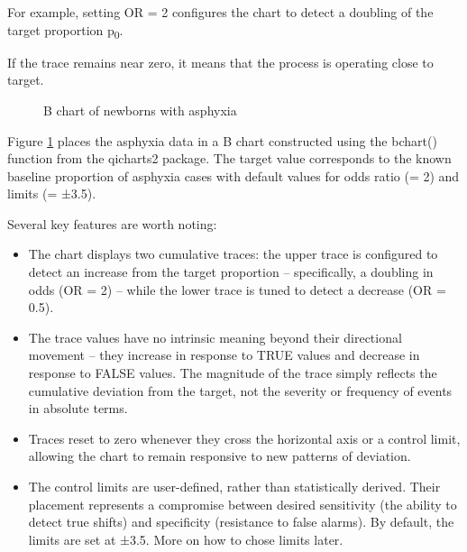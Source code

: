 \documentclass[
]{book}
\makeatletter
\newenvironment{Shaded}{\begin{snugshade}}{\end{snugshade}}
\newcommand{\AttributeTok}[1]{\textcolor[rgb]{0.13,0.29,0.53}{#1}}
\newcommand{\DecValTok}[1]{\textcolor[rgb]{0.00,0.00,0.81}{#1}}
\newcommand{\FloatTok}[1]{\textcolor[rgb]{0.00,0.00,0.81}{#1}}
\newcommand{\FunctionTok}[1]{\textcolor[rgb]{0.13,0.29,0.53}{\textbf{#1}}}
\newcommand{\NormalTok}[1]{#1}
\newcommand{\SpecialCharTok}[1]{\textcolor[rgb]{0.81,0.36,0.00}{\textbf{#1}}}
\newcommand*\pandocbounded[1]{%
  \sbox\pandoc@box{#1}%
  \Gscale@div\@tempa{\textheight}{\dimexpr\ht\pandoc@box+\dp\pandoc@box\relax}%
  \Gscale@div\@tempb{\linewidth}{\wd\pandoc@box}%
  \ifdim\@tempb\p@<\@tempa\p@\let\@tempa\@tempb\fi%
  \ifdim\@tempa\p@<\p@\scalebox{\@tempa}{\usebox\pandoc@box}%
  \else\usebox{\pandoc@box}%
  \fi%
}
\makeatother
\begin{document}
For example, setting OR = 2 configures the chart to detect a doubling of the target proportion p\textsubscript{0}.

If the trace remains near zero, it means that the process is operating close to target.

\begin{Shaded}
\end{Shaded}

\begin{figure}
\centering
\pandocbounded{}
\caption{\label{fig:rare-fig6}B chart of newborns with asphyxia}
\end{figure}

Figure \ref{fig:rare-fig6} places the asphyxia data in a B chart constructed using the bchart() function from the qicharts2 package. The target value corresponds to the known baseline proportion of asphyxia cases with default values for odds ratio (= 2) and limits (= ±3.5).

Several key features are worth noting:

\begin{itemize}
\item
  The chart displays two cumulative traces: the upper trace is configured to detect an increase from the target proportion -- specifically, a doubling in odds (OR = 2) -- while the lower trace is tuned to detect a decrease (OR = 0.5).
\item
  The trace values have no intrinsic meaning beyond their directional movement -- they increase in response to TRUE values and decrease in response to FALSE values. The magnitude of the trace simply reflects the cumulative deviation from the target, not the severity or frequency of events in absolute terms.
\item
  Traces reset to zero whenever they cross the horizontal axis or a control limit, allowing the chart to remain responsive to new patterns of deviation.
\item
  The control limits are user-defined, rather than statistically derived. Their placement represents a compromise between desired sensitivity (the ability to detect true shifts) and specificity (resistance to false alarms). By default, the limits are set at ±3.5. More on how to chose limits later.
\end{itemize}
\end{document}
